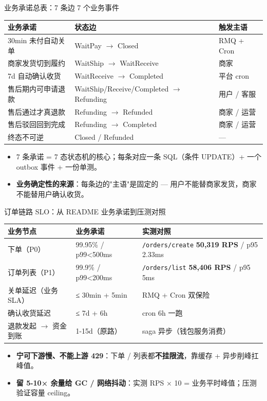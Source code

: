 \documentclass[aspectratio=169,11pt]{beamer}
\begin{document}
\begin{frame}[shrink]{业务承诺总表：7 条边 7 个业务事件}
{\small
\begin{tabular}{@{}p{3.5cm}p{3cm}p{3.5cm}@{}}
\toprule
业务承诺 & 状态边 & 触发主语 \\
\midrule
30min 未付自动关单     & WaitPay $\to$ Closed       & RMQ + Cron \\
商家发货切到履约       & WaitShip $\to$ WaitReceive & 商家 \\
7d 自动确认收货        & WaitReceive $\to$ Completed & 平台 cron \\
售后期内可申请退款     & WaitShip/Receive/Completed $\to$ Refunding & 用户 / 客服 \\
售后通过才真退款       & Refunding $\to$ Refunded   & 商家 / 运营 \\
售后驳回回到完成       & Refunding $\to$ Completed  & 商家 / 运营 \\
终态不可逆            & Closed / Refunded      & — \\
\bottomrule
\end{tabular}}
\vspace{2mm}
\begin{itemize}
  \item 7 条承诺 = 7 态状态机的核心；每条对应一条 SQL（条件 UPDATE）+ 一个 outbox 事件 + 一份单测。
  \item \textbf{业务确定性的来源}：每条边的"主语"是固定的 — 用户不能替商家发货，商家不能替用户确认收货。
\end{itemize}
\end{frame}

\begin{frame}[shrink]{订单链路 SLO：从 README 业务承诺到压测对照}
{\small
\begin{tabular}{@{}p{4cm}p{2.5cm}p{2.5cm}@{}}
\toprule
业务节点 & 业务承诺 & 实测对照 \\
\midrule
下单（P0）             & 99.95\% / p99<500ms & \texttt{/orders/create} \textbf{50,319 RPS} / p95 2.33ms \\
订单列表（P1）         & 99.9\% / p99<200ms  & \texttt{/orders/list} \textbf{58,406 RPS} / p95 5ms \\
关单延迟（业务 SLA）   & ≤ 30min + 5min      & RMQ + Cron 双保险 \\
确认收货延迟           & ≤ 7d + 6h           & cron 6h 一跑 \\
退款发起 $\to$ 资金到账    & 1-15d（原路）       & saga 异步（钱包服务消费）\\
\bottomrule
\end{tabular}}
\vspace{2mm}
\begin{itemize}
  \item \textbf{宁可下游慢、不能上游 429}：下单 / 列表都\textbf{不挂限流}，靠缓存 + 异步削峰扛峰值。
  \item \textbf{留 5-10× 余量给 GC / 网络抖动}：实测 RPS × 10 = 业务平时峰值；压测验证容量 ceiling。
\end{itemize}
\end{frame}
\end{document}
